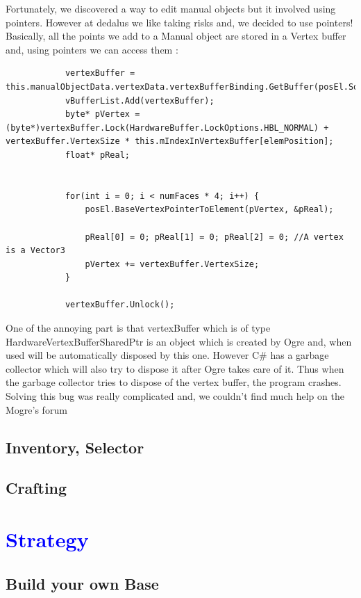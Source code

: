 \documentclass[article]{report}         %
\begin{document}
        Fortunately, we discovered a way to edit manual objects but it involved using pointers. However at dedalus we like taking risks and, we decided to use pointers!\\
        Basically, all the points we add to a Manual object are stored in a Vertex buffer and, using pointers we can access them :

        \begin{lstlisting}
            vertexBuffer = this.manualObjectData.vertexData.vertexBufferBinding.GetBuffer(posEl.Source);
            vBufferList.Add(vertexBuffer);
            byte* pVertex = (byte*)vertexBuffer.Lock(HardwareBuffer.LockOptions.HBL_NORMAL) + vertexBuffer.VertexSize * this.mIndexInVertexBuffer[elemPosition];
            float* pReal;


            for(int i = 0; i < numFaces * 4; i++) {
                posEl.BaseVertexPointerToElement(pVertex, &pReal);

                pReal[0] = 0; pReal[1] = 0; pReal[2] = 0; //A vertex is a Vector3
                pVertex += vertexBuffer.VertexSize;
            }

            vertexBuffer.Unlock();
            \end{lstlisting}

            One of the annoying part is that vertexBuffer which is of type HardwareVertexBufferSharedPtr is an object which is created by Ogre and, when used will be automatically disposed by this one. However C# has a garbage collector which will also try to dispose it after Ogre takes care of it. Thus when the garbage collector tries to dispose of the vertex buffer, the program crashes.\\


            Solving this bug was really complicated and, we couldn't find much help on the Mogre's forum




      \section{Inventory, Selector}
      \section{Crafting}
    \chapter{\textcolor{blue}{Strategy}}
      \section{Build your own Base}
\end{document}
